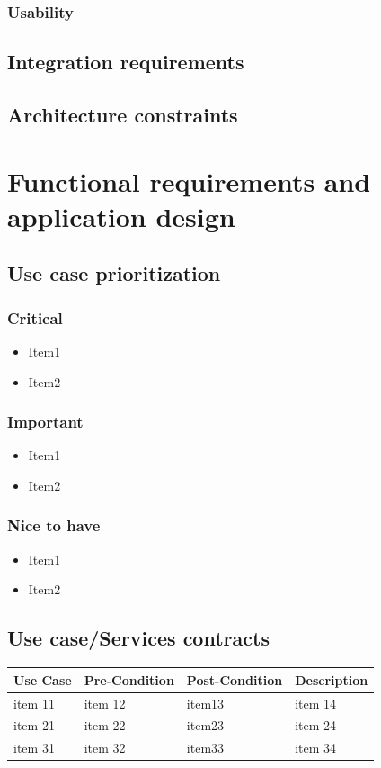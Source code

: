 \documentclass[a4paper,10pt]{article}
\begin{document}
\subsubsection{Usability}

\subsection{Integration requirements}

\subsection{Architecture constraints}

\section{Functional requirements and application design}
\subsection{Use case prioritization}
\subsubsection{Critical}
\begin{itemize}
\item Item1
\item Item2
\end{itemize}

\subsubsection{Important}
\begin{itemize}
\item Item1
\item Item2
\end{itemize}

\subsubsection{Nice to have}
\begin{itemize}
\item Item1
\item Item2
\end{itemize}

\subsection{Use case/Services contracts}
\begin{tabu} to \textwidth { | X[l] | X[l] | X[l] | X[l] | }
	\hline
		Use Case		& Pre-Condition		& Post-Condition		& Description	\\ \hline \hline
		item 11		& item 12			& item13				& item 14  \\ \hline
		item 21		& item 22			& item23				& item 24  \\ \hline
		item 31		& item 32			& item33				& item 34  \\
	\hline
\end{tabu}
\end{document}

